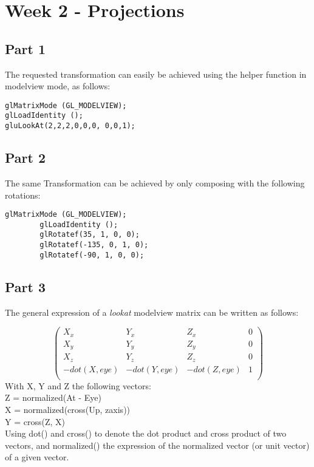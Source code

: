 \chapter{Week 2 - Projections}

\section{Part 1}

The requested transformation can easily be achieved using the helper function
 in modelview mode, as follows:

\begin{lstlisting}
glMatrixMode (GL_MODELVIEW);
glLoadIdentity ();
gluLookAt(2,2,2,0,0,0, 0,0,1);
\end{lstlisting}


\section{Part 2}
The same Transformation can be achieved by only composing with the following rotations:
\begin{lstlisting}[caption=Extract from Part2.cpp]
        glMatrixMode (GL_MODELVIEW);
        glLoadIdentity ();
        glRotatef(35, 1, 0, 0);
        glRotatef(-135, 0, 1, 0);
        glRotatef(-90, 1, 0, 0);
\end{lstlisting}

\section{Part 3}


The general expression of a \textit{lookat} modelview matrix can be written as follows:

$$\begin{pmatrix}
 	X_x&		Y_x&           	Z_x&          	0\\
	 X_y&       Y_y&           	Z_y&          	0\\
	 X_z&       Y_z&           	Z_z&          	0\\
	-dot(X, eye)&  -dot(Y, eye)&  	-dot(Z, eye)&  	1\\
\end{pmatrix}$$
With X, Y and Z the following vectors:\\
Z = normalized(At - Eye)\\
X = normalized(cross(Up, zaxis))\\
Y = cross(Z, X)\\
Using dot() and cross() to denote the dot product and cross product of two vectors,
and normalized() the expression of the normalized vector (or unit vector) of a given vector.
